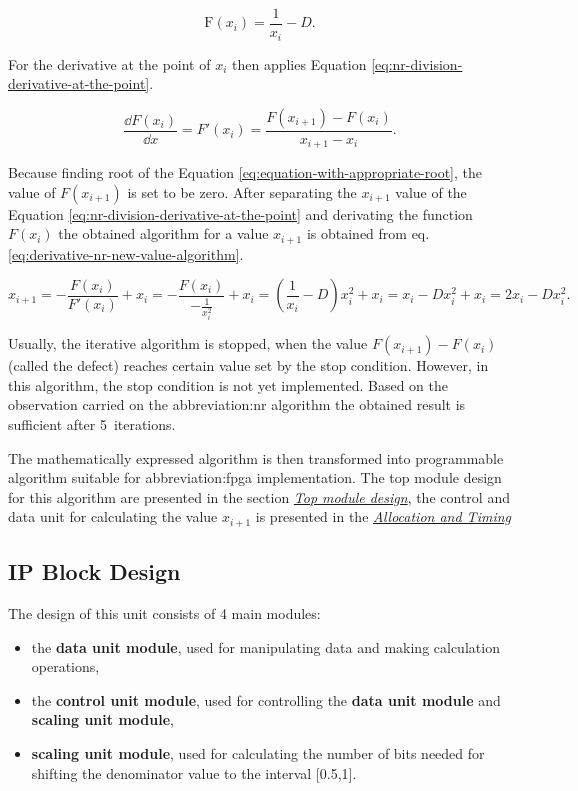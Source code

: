 \documentclass[a4paper, twoside, 11pt]{article}
\begin{document}
\begin{equation}\label{eq:equation-with-appropriate-root}
  \text{F} (x_i) = \frac{1}{x_i} - D.
\end{equation}

\noindent For the derivative at the point of $x_i$ then applies Equation \ref{eq:nr-division-derivative-at-the-point}.

\begin{equation}\label{eq:nr-division-derivative-at-the-point}
  \frac{\dd F(x_i)}{\dd x} = F'(x_i) = \frac{F (x_{i+1}) - F (x_i)}{x_{i+1}-x_i}.
\end{equation}

\noindent Because finding root of the Equation \ref{eq:equation-with-appropriate-root}, the value of $F (x_{i+1})$ is set to be zero. After separating the $x_{i+1}$ value of the Equation \ref{eq:nr-division-derivative-at-the-point} and derivating the function $F (x_i)$ the obtained algorithm for a value $x_{i+1}$ is obtained from eq. \ref{eq:derivative-nr-new-value-algorithm}.\par

\begin{equation}\label{eq:derivative-nr-new-value-algorithm}
  x_{i+1} = -\frac{F (x_i)}{F' (x_i)} + x_i = - \frac{F (x_i)}{-\frac{1}{x_i^2}} + x_i = (\frac{1}{x_i} - D) x_i^2 + x_i = x_i - D x_i^2 + x_i = 2 x_i - D x_i^2.
\end{equation}

Usually, the iterative algorithm is stopped, when the value $F(x_{i+1}) - F(x_i)$ (called the defect) reaches certain value set by the stop condition. However, in this algorithm, the stop condition is not yet implemented. Based on the observation carried on the \gls{abbreviation:nr} algorithm the obtained result is sufficient after 5~iterations.

The mathematically expressed algorithm is then transformed into programmable algorithm suitable for \gls{abbreviation:fpga} implementation. The top module design for this algorithm are presented in the section \hyperref[subsubsec:division-top-module-design]{\textit{Top module design}}, the control and data unit for calculating the value $x_{i+1}$ is presented in the \hyperref[subsubsec:division-allocation-and-timing]{\textit{Allocation and Timing}}

\subsection{IP Block Design}\label{subsec:division-ip-block-design}
The design of this unit consists of 4 main modules:
\begin{itemize}
  \item the \textbf{data unit module}, used for manipulating data and making calculation operations,
  \item the \textbf{control unit module}, used for controlling the \textbf{data unit module} and \textbf{scaling unit module},
  \item \textbf{scaling unit module}, used for calculating the number of bits needed for shifting the denominator value to the interval [0.5,1].
\end{itemize}
\end{document}
